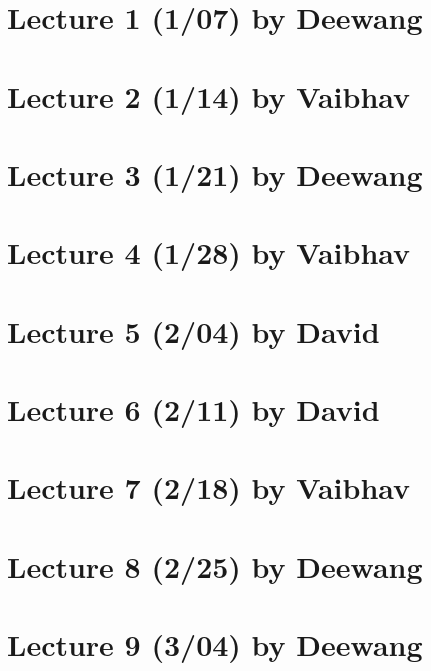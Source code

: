 
 




\section{Lecture 1 (1/07) by Deewang}\label{lecture1}

\newpage

\section{Lecture 2 (1/14) by Vaibhav}\label{lecture2}

\newpage

\section{Lecture 3 (1/21) by Deewang}\label{lecture3}

\newpage

\section{Lecture 4 (1/28) by Vaibhav}\label{lecture4}

\newpage

\section{Lecture 5 (2/04) by David}\label{lecture5}

\newpage

\section{Lecture 6 (2/11) by David}\label{lecture6}

\newpage

\section{Lecture 7 (2/18) by Vaibhav}\label{lecture7}

\newpage

\section{Lecture 8 (2/25) by Deewang}\label{lecture8}

\newpage

\section{Lecture 9 (3/04) by Deewang}\label{lecture9}

\newpage
%
%
%
\appendix

